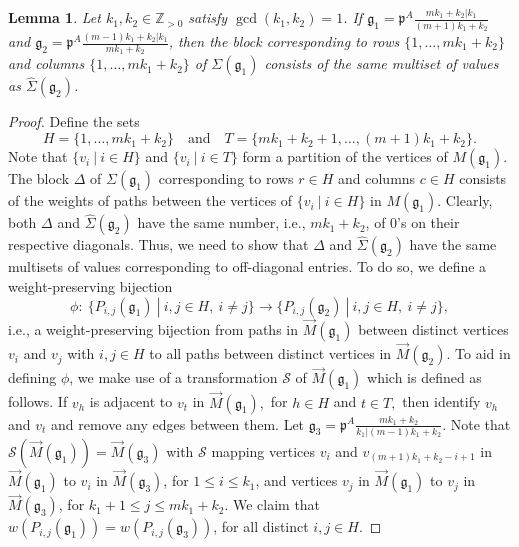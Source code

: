 \documentclass[letterpaper,10pt]{article}
\newtheorem{lemma}[theorem]{Lemma}
\begin{document}
\begin{lemma}\label{lem:trbbase1}
Let $k_1,k_2\in\mathbb{Z}_{>0}$ satisfy $\gcd(k_1,k_2)=1$. If $\mathfrak{g}_1=\mathfrak{p}^A\frac{mk_1+k_2|k_1}{(m+1)k_1+k_2}$ and $\mathfrak{g}_2=\mathfrak{p}^A\frac{(m-1)k_1+k_2|k_1}{mk_1+k_2}$, then the block corresponding to rows $\{1,\hdots,mk_1+k_2\}$ and columns $\{1,\hdots,mk_1+k_2\}$ of $\Sigma(\mathfrak{g}_1)$ consists of the same multiset of values as $\widehat{\Sigma}(\mathfrak{g}_2)$.
\end{lemma}
\begin{proof}
Define the sets $$H=\{1,\hdots,mk_1+k_2\}\quad\text{and}\quad T=\{mk_1+k_2+1,\hdots,(m+1)k_1+k_2\}.$$ Note that $\{v_i~|~i\in H\}$ and $\{v_i~|~i\in T\}$ form a partition of the vertices of $M(\mathfrak{g}_1)$. The block $\Delta$ of $\Sigma(\mathfrak{g}_1)$ corresponding to rows $r\in H$ and columns $c\in H$ consists of the weights of paths between the vertices of $\{v_i~|~i\in H\}$ in $M(\mathfrak{g}_1)$. Clearly, both $\Delta$ and $\widehat{\Sigma}(\mathfrak{g}_2)$ have the same number, i.e., $mk_1+k_2$, of 0's on their respective diagonals. Thus, we need to show that $\Delta$ and $\widehat{\Sigma}(\mathfrak{g}_2)$ have the same multisets of values corresponding to off-diagonal entries. To do so, we define a weight-preserving bijection 
$$\phi:~\{P_{i,j}(\mathfrak{g}_1)~|~i,j\in H,~i\neq j\}\to\{P_{i,j}(\mathfrak{g}_2)~|~i,j\in H,~i\neq j\},$$ i.e., a weight-preserving bijection from paths in $\overrightarrow{M}(\mathfrak{g}_1)$ between distinct vertices $v_i$ and $v_j$ with $i,j\in H$ to all paths between distinct vertices in $\overrightarrow{M}(\mathfrak{g}_2)$. To aid in defining $\phi$, we make use of a transformation $\mathcal{S}$ of $\overrightarrow{M}(\mathfrak{g}_1)$ which is defined as follows. If $v_h$ is adjacent to $v_t$ in $\overrightarrow{M}(\mathfrak{g}_1),$ for $h\in H$ and $t\in T,$ then identify $v_h$ and $v_t$ and remove any edges between them. Let $\mathfrak{g}_3=\mathfrak{p}^A\frac{mk_1+k_2}{k_1|(m-1)k_1+k_2}$. Note that $\mathcal{S}(\overrightarrow{M}(\mathfrak{g}_1))=\overrightarrow{M}(\mathfrak{g}_3)$ with $\mathcal{S}$ mapping vertices $v_{i}$ and $v_{(m+1)k_1+k_2-i+1}$ in $\overrightarrow{M}(\mathfrak{g}_1)$ to $v_{i}$ in $\overrightarrow{M}(\mathfrak{g}_3)$, for $1\le i\le k_1$, and vertices $v_{j}$ in $\overrightarrow{M}(\mathfrak{g}_1)$ to $v_{j}$ in $\overrightarrow{M}(\mathfrak{g}_3)$, for $k_1+1\le j\le mk_1+k_2$. We claim that $w(P_{i,j}(\mathfrak{g}_1))=w(P_{i,j}(\mathfrak{g}_3))$, for all distinct $i,j\in H$.


\end{proof}
\end{document}
